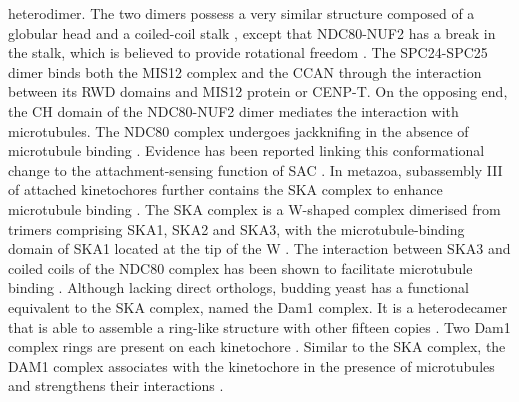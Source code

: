 heterodimer. The two dimers possess a very similar structure composed of a globular head and a coiled-coil stalk \citep{Wei2006StructureDomain, Wei2005MolecularComponent, Wei2006TheAttachment, Ciferri2005ArchitectureKinetochore, Ciferri2008ImplicationsComplex}, except that NDC80-NUF2 has a break in the stalk, which is believed to provide rotational freedom \citep{Tang2013Ndc80Motif}. The SPC24-SPC25 dimer binds both the MIS12 complex and the CCAN through the interaction between its RWD domains and MIS12 protein or CENP-T. On the opposing end, the CH domain of the NDC80-NUF2 dimer mediates the interaction with microtubules. The NDC80 complex undergoes jackknifing in the absence of microtubule binding \citep{Roscioli2020, Scarborough2019TightMicrotubules}. Evidence has been reported linking this conformational change to the attachment-sensing function of SAC \citep{Wan2009ProteinSite, Aravamudhan2015TheSignalling}. In metazoa, subassembly III of attached kinetochores further contains the SKA complex to enhance microtubule binding \citep{Welburn2009TheMotility, Gaitanos2009StableSka3/C13Orf3, Theis2009ComparativeDivision}. The SKA complex is a W-shaped complex dimerised from trimers comprising SKA1, SKA2 and SKA3, with the microtubule-binding domain of SKA1 located at the tip of the W \citep{Abad2014StructuralComplex, Jeyaprakash2012StructuralInterface, Schmidt2012TheProtofilaments}. The interaction between SKA3 and coiled coils of the NDC80 complex has been shown to facilitate microtubule binding \citep{Abad2016Ska3Domain, Chan2012AuroraInteraction, Helgeson2018HumanAttachments, Zhang2017Ska3Progression}. Although lacking direct orthologs, budding yeast has a functional equivalent to the SKA complex, named the Dam1 complex. It is a heterodecamer that is able to assemble a ring-like structure with other fifteen copies \citep{Jenni2018StructureInterface, Miranda2005TheMicrotubules, Ramey2011TheMicrotubule, Westermann2005FormationComplex}. Two Dam1 complex rings are present on each kinetochore \citep{Kim2017TheRings}. Similar to the SKA complex, the DAM1 complex associates with the kinetochore in the presence of microtubules \citep{Li2002TheKinetochore} and strengthens their interactions \citep{Lampert2013MolecularComplexes, Lampert2010TheComplex, Tien2010CooperationB}. 

